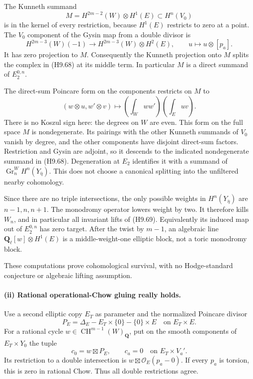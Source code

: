 \documentclass[11pt,a4paper]{article}
\begin{document}
The Kunneth summand
\[
 M=H^{2m-2}(W)\otimes H^1(E)
       \subset H^n(V_0)                                    \tag{H9.69}
\]
is in the kernel of every restriction, because $H^1(E)$ restricts
to zero at a point. The $V_0$ component of the Gysin map from a
double divisor is
\[
 H^{2m-3}(W)(-1)\longrightarrow H^{2m-3}(W)\otimes H^2(E),
       \qquad u\longmapsto u\otimes[p_a].
\]
It has zero projection to $M$. Consequently the Kunneth projection
onto $M$ splits the complex in (H9.68) at its middle term. In
particular $M$ is a direct summand of $E_2^{0,n}$.

The direct-sum Poincare form on the components restricts on $M$ to
\[
 (w\otimes u,w'\otimes v)
       \longmapsto \left(\int_Www'\right)\left(\int_Euv\right).
                                                               \tag{H9.70}
\]
There is no Koszul sign here: the degrees on $W$ are even. This
form on the full space $M$ is nondegenerate. Its pairings with the
other Kunneth summands of $V_0$ vanish by degree, and the other
components have disjoint direct-sum factors. Restriction and Gysin
are adjoint, so it descends to the indicated nondegenerate summand
in (H9.68). Degeneration at $E_2$ identifies it with a summand of
$\operatorname{Gr}^W_nH^n(Y_{\bar\eta})$. This does not choose a
canonical splitting into the unfiltered nearby cohomology.

Since there are no triple intersections, the only possible weights
in $H^n(Y_{\bar\eta})$ are $n-1,n,n+1$. The monodromy operator
lowers weight by two. It therefore kills $W_n$, and in particular
all invariant lifts of (H9.69). Equivalently its induced map out of
$E_2^{0,n}$ has zero target. After the twist by $m-1$, an algebraic
line $\mathbf Q_\ell[w]\otimes H^1(E)$ is a middle-weight-one
elliptic block, not a toric monodromy block.

These computations prove cohomological survival, with no
Hodge-standard conjecture or algebraic lifting assumption.

\paragraph{(ii) Rational operational-Chow gluing really holds.}
Use a second elliptic copy $E_T$ as parameter and the normalized
Poincare divisor
\[
 P_E=\Delta_E-E_T\times\{0\}-\{0\}\times E
             \quad\text{on }E_T\times E.
\]
For a rational cycle $w\in\operatorname{CH}^{m-1}(W)_{\mathbf Q}$,
put on the smooth components of $E_T\times Y_0$ the tuple
\[
             c_0=w\boxtimes P_E,
       \qquad c_a=0\quad\text{on }E_T\times V_a'.           \tag{H9.71}
\]
Its restriction to a double intersection is
$w\boxtimes\mathcal O_E(p_a-0)$. If every $p_a$ is torsion, this
is zero in rational Chow. Thus all double restrictions agree.
\end{document}
